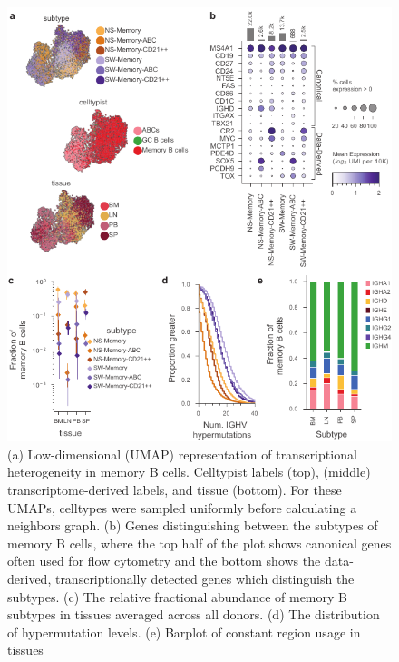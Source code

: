 \begin{figure}
    \centering
    \includegraphics[width=12cm, keepaspectratio]{figs/Tabula_Bursa/EDFigure2_MemB_subtypes.pdf}
    \caption[Heterogeneity in memory B cells.] {(a) Low-dimensional (UMAP) representation of transcriptional heterogeneity in memory B cells. Celltypist labels (top), (middle) transcriptome-derived labels, and tissue (bottom). For these UMAPs, celltypes were sampled uniformly before calculating a neighbors graph. (b) Genes distinguishing between the subtypes of memory B cells, where the top half of the plot shows canonical genes often used for flow cytometry and the bottom shows the data-derived, transcriptionally detected genes which distinguish the subtypes. (c) The relative fractional abundance of memory B subtypes in tissues averaged across all donors. (d) The distribution of  hypermutation levels. (e) Barplot of constant region usage in tissues}
    \label{ED:memoryb-overview}
\end{figure}


